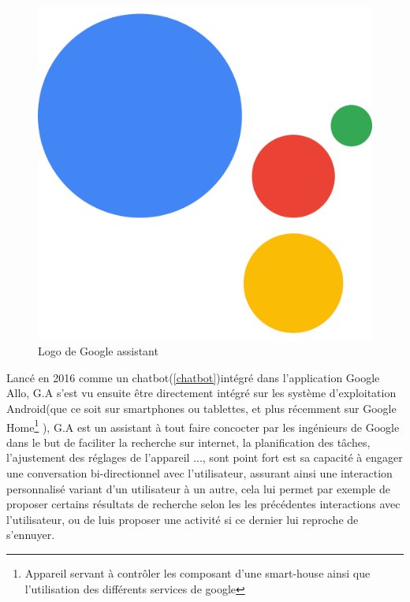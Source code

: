 \paragraph{}
\begin{figure}[H]
	\centering
	\includegraphics[width=.2\linewidth]{images/google_assitant/logo.png}
	\caption{Logo de Google assistant} 
\end{figure}
Lancé en 2016 comme un chatbot(\ref{chatbot})intégré dans l'application Google Allo, G.A s'est vu ensuite être directement intégré sur les système d'exploitation Android(que ce soit sur smartphones ou tablettes, et plus récemment sur Google Home\footnote{Appareil servant à contrôler les composant d'une smart-house ainsi que l'utilisation des différents services de google} ), G.A est un assistant à tout faire concocter par les ingénieurs de Google dans le but de faciliter la recherche sur internet, la planification des tâches, l'ajustement des réglages de l'appareil ..., sont point fort est sa capacité à engager une conversation bi-directionnel avec l'utilisateur, assurant ainsi une interaction personnalisé variant d'un utilisateur à un autre, cela lui permet par exemple de proposer certains résultats de recherche selon les les précédentes interactions avec l'utilisateur, ou de luis proposer une activité si ce dernier lui reproche de s'ennuyer.
